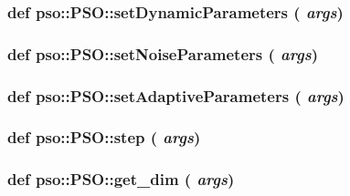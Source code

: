 \hypertarget{classpso_1_1PSO_fda65366f31eb6b6c534f95d5153d050}{
\subsubsection{\setlength{\rightskip}{0pt plus 5cm}def pso::PSO::setDynamicParameters ( {\em args})}}
\label{classpso_1_1PSO_fda65366f31eb6b6c534f95d5153d050}


\hypertarget{classpso_1_1PSO_ebc90f7f5e25a1afe5ae032fefe575dd}{
\subsubsection{\setlength{\rightskip}{0pt plus 5cm}def pso::PSO::setNoiseParameters ( {\em args})}}
\label{classpso_1_1PSO_ebc90f7f5e25a1afe5ae032fefe575dd}


\hypertarget{classpso_1_1PSO_d3ca64b7144ad5a3b4e3d6cc28be991c}{
\subsubsection{\setlength{\rightskip}{0pt plus 5cm}def pso::PSO::setAdaptiveParameters ( {\em args})}}
\label{classpso_1_1PSO_d3ca64b7144ad5a3b4e3d6cc28be991c}


\hypertarget{classpso_1_1PSO_b71a6d7ced88347ca2961cda8f9b4b77}{
\subsubsection{\setlength{\rightskip}{0pt plus 5cm}def pso::PSO::step ( {\em args})}}
\label{classpso_1_1PSO_b71a6d7ced88347ca2961cda8f9b4b77}


\hypertarget{classpso_1_1PSO_f8d0aa8bfb1f15498f5832c0258db0b8}{
\subsubsection{\setlength{\rightskip}{0pt plus 5cm}def pso::PSO::get\_\-dim ( {\em args})}}
\label{classpso_1_1PSO_f8d0aa8bfb1f15498f5832c0258db0b8}


